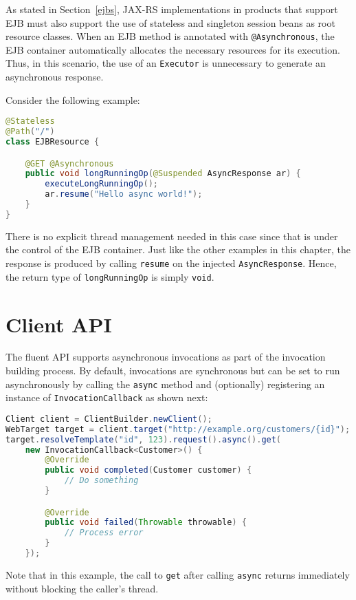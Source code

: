 As stated in Section~\ref{ejbs}, JAX-RS implementations in products that support EJB must also support the use of
stateless and singleton session beans as root resource classes. When an EJB method is annotated with
\lstinline{@Asynchronous}, the EJB container automatically allocates the necessary resources for its execution. Thus, in
this scenario, the use of an \lstinline{Executor} is unnecessary to generate an asynchronous response.

Consider the following example:

\begin{lstlisting}[language=Java]
@Stateless 
@Path("/")
class EJBResource {

    @GET @Asynchronous
    public void longRunningOp(@Suspended AsyncResponse ar) {
        executeLongRunningOp();
        ar.resume("Hello async world!");
    }
}
\end{lstlisting}

There is no explicit thread management needed in this case since that is under the control of the EJB container. Just
like the other examples in this chapter, the response is produced by calling \lstinline{resume} on the injected
\lstinline{AsyncResponse}. Hence, the return type of \lstinline{longRunningOp} is simply \lstinline{void}.

\section{Client API}
\label{client_api_async}

The fluent API supports asynchronous invocations as part of the invocation building process. By default, invocations are
synchronous but can be set to run asynchronously by calling the \lstinline{async} method and (optionally) registering an
instance of \lstinline{InvocationCallback} as shown next:

\begin{lstlisting}[language=Java]
Client client = ClientBuilder.newClient();
WebTarget target = client.target("http://example.org/customers/{id}");
target.resolveTemplate("id", 123).request().async().get(
    new InvocationCallback<Customer>() {
        @Override
        public void completed(Customer customer) {
            // Do something
        }

        @Override
        public void failed(Throwable throwable) {
            // Process error
        }
    });
\end{lstlisting}

Note that in this example, the call to \lstinline{get} after calling \lstinline{async} returns immediately without
blocking the caller's thread.

